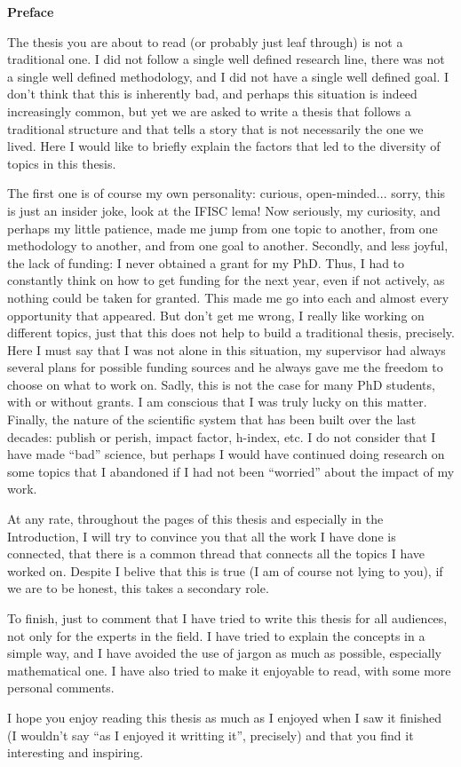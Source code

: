 \pagebreak
\thispagestyle{empty}

\begin{center}
    \textbf{\Large Preface}
\end{center}

The thesis you are about to read (or probably just leaf through) is not a
traditional one. I did not follow a single well defined research line, there
was not a single well defined methodology, and I did not have a single well
defined goal. I don't think that this is inherently bad, and perhaps this
situation is indeed increasingly common, but yet we are asked to write a thesis
that follows a traditional structure and that tells a story that is not
necessarily the one we lived. Here I would like to briefly explain the factors
that led to the diversity of topics in this thesis.

The first one is of course my own personality: curious, open-minded... sorry,
this is just an insider joke, look at the IFISC lema! Now seriously, my
curiosity, and perhaps my little patience, made me jump from one topic to
another, from one methodology to another, and from one goal to another.
Secondly, and less joyful, the lack of funding: I never obtained a grant for my
PhD. Thus, I had to constantly think on how to get funding for
the next year, even if not actively, as nothing could be taken for granted.
This made me go into each and almost every opportunity that appeared. But don't
get me wrong, I really like working on different topics, just that this does
not help to build a traditional thesis, precisely. Here I must say that I was
not alone in this situation, my supervisor had always several plans for
possible funding sources and he always gave me the freedom to choose on what to
work on. Sadly, this is not the case for many PhD students, with or without
grants. I am conscious that I was truly lucky on this matter. Finally, the
nature of the scientific system that has been built over the last decades:
publish or perish, impact factor, h-index, etc. I do not consider that I
have made ``bad'' science, but perhaps I would have continued doing research on
some topics that I abandoned if I had not been ``worried'' about the impact of
my work.

At any rate, throughout the pages of this thesis and especially in the
Introduction, I will try to convince you that all the work I have done is
connected, that there is a common thread that connects all the topics I have
worked on. Despite I belive that this is true (I am of course not lying to
you), if we are to be honest, this takes a secondary role.

To finish, just to comment that I have tried to write this thesis for all
audiences, not only for the experts in the field. I have tried to explain the
concepts in a simple way, and I have avoided the use of jargon as much as
possible, especially mathematical one. I have also tried to make it enjoyable
to read, with some more personal comments.

I hope you enjoy reading this thesis as much as I enjoyed when I saw it
finished (I wouldn't say ``as I enjoyed it writting it'', precisely) and that
you find it interesting and inspiring.

\vfill